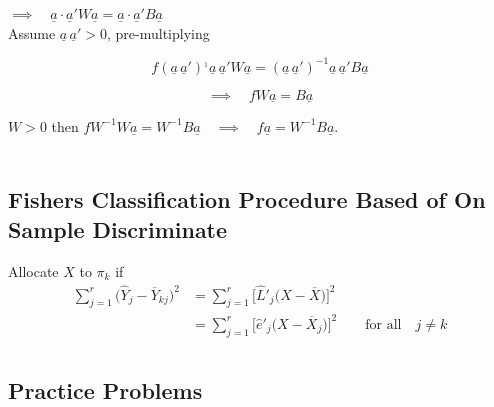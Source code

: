 \documentclass[11pt,a4paper]{article}
\theoremstyle{definition}
\begin{document}
$\implies \quad  \underline{a}\cdot \underline{a}' W \underline{a} = \underline{a}\cdot \underline{a}'B \underline{a}$\\

Assume $\underline{a}\, \underline{a}' >0$, pre-multiplying

$$f(\underline{a}\,\underline{a}')^{_1} \underline{a}\, \underline{a}' W \underline{a} = (\underline{a}\,\underline{a}')^{-1}\underline{a}\, \underline{a}'B\underline{a}$$

$$\implies \quad  fW\underline{a} = B\underline{a}$$

$W>0$ then $fW^{-1} W \underline{a} = W^{-1}B\underline{a}\quad \implies \quad  f\underline{a} = W^{-1}B\underline{a}$.\\\\



\subsection{Fishers Classification Procedure Based of On Sample Discriminate}
Allocate $X$ to $\pi_k$ if
\begin{align*}
\sum^r_{j=1}\big(\widehat{Y}_j-\overline{Y}_{kj}\big)^2 & = \sum^r_{j=1}\big[\widehat{L}'_j\big(X-\overline{X}\big)\big]^2\\
& = \sum^r_{j=1}\big[\widehat{e}'_j\big(X-\overline{X}_j\big)\big]^2\qquad\text{for all}\quad  j\neq k\\
\end{align*}



























\pagebreak

\subsection{Practice Problems}
\end{document}
